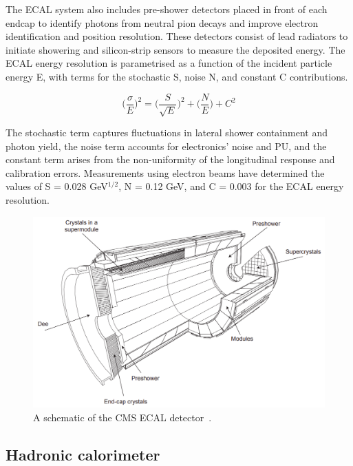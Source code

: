 The \ac{ECAL} system also includes pre-shower detectors placed in front of each endcap to identify photons from neutral pion decays and improve electron identification and position resolution. 
These detectors consist of lead radiators to initiate showering and silicon-strip sensors to measure the deposited energy. 
The \ac{ECAL} energy resolution is parametrised as a function of the incident particle energy E, with terms for the stochastic S, noise N, and constant C contributions.

\begin{equation}
\Big(\frac{\sigma}{E}\Big)^2 = \Big(\frac{S}{\sqrt{E}}\Big)^2 + \Big( \frac{N}{E} \Big) + C^2
\end{equation}

The stochastic term captures fluctuations in lateral shower containment and photon yield, the noise term accounts for electronics' noise and \ac{PU}, and the constant term arises from the non-uniformity of the longitudinal response and calibration errors. 
Measurements using electron beams have determined the values of S = 0.028 GeV$^{1/2}$, N = 0.12 GeV, and C = 0.003 for the \ac{ECAL} energy resolution.

\begin{figure}[!hbtp]
    \centering
    \includegraphics[width=\textwidth]{Figures/ECAL.png}
    \caption[Diagram of the CMS ECAL.]{A schematic of the CMS ECAL detector~\cite{CMS_Setup}.}
    \label{fig:ecal}
\end{figure}

\subsection{Hadronic calorimeter}

